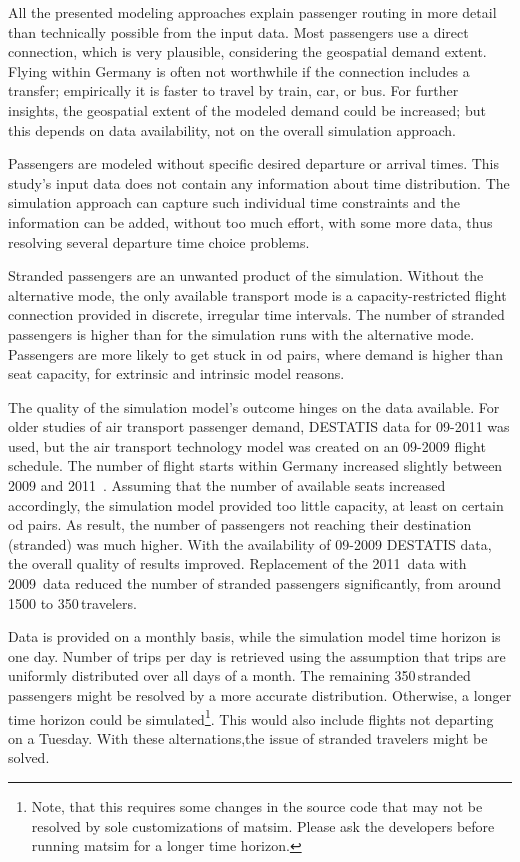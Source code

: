 All the presented modeling approaches explain passenger routing in more detail than technically possible from the input data.  
Most passengers use a direct connection, which is very plausible, considering the geospatial demand extent.  
Flying within Germany is often not worthwhile if the connection includes a transfer; 
empirically it is faster to travel by train, car, or bus. 
For further insights, the geospatial extent of the modeled demand could be increased; but this depends on data availability,  not on the overall simulation approach. 

Passengers are modeled without specific desired departure or arrival times. 
This study's input data does not contain any information about time distribution. 
The simulation approach can capture such individual time constraints and  
the information can be added, without too much effort, with some more data, thus 
resolving several departure time choice problems. 

Stranded passengers are an unwanted product of the simulation. 
Without the alternative mode, the only available transport mode is a capacity-restricted flight connection provided in discrete, irregular time intervals. 
The number of stranded passengers is higher than for the simulation runs with the alternative mode. 
Passengers are more likely to get stuck in \gls{od} pairs, where demand is higher than seat capacity, for 
extrinsic and intrinsic model reasons. 

The quality of the simulation model's outcome hinges on the data available.  
For older studies of air transport passenger demand, DESTATIS data for 09-2011 was used, but 
the air transport technology model was created on an 09-2009 flight schedule.  
The number of flight starts within Germany increased slightly between 2009 and 2011~\citep[][p.~23]{DLR2011Luftverkehrsbericht}. 
Assuming that the number of available seats increased accordingly, the simulation model provided too little capacity, at least on certain \gls{od} pairs. 
As result, the number of passengers not reaching their destination (stranded) was much higher.  
With the availability of 09-2009 DESTATIS data, the overall quality of results improved.  
Replacement of the 2011~data with 2009~data reduced the number of stranded passengers significantly, from around 1500 to 350\,travelers. 

Data is provided on a monthly basis, while the simulation model time horizon is one day. 
Number of trips per day is retrieved using the assumption that trips are uniformly distributed over all days of a month.  
The remaining 350\,stranded passengers might be resolved by a more accurate distribution. 
Otherwise, a longer time horizon could be simulated\footnote{Note, that this requires some changes in the source code that may not be resolved by sole customizations of \gls{matsim}. Please ask the developers before running \gls{matsim} for a longer time horizon.}. 
This would also include flights not departing on a Tuesday. 
With these alternations,the issue of stranded travelers might be solved. 

